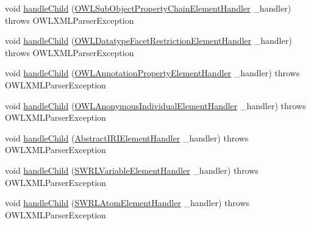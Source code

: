 \begin{DoxyCompactItemize}
\item 
void \hyperlink{classorg_1_1coode_1_1owlapi_1_1owlxmlparser_1_1_abstract_o_w_l_element_handler_3_01_o_01_4_a37fd0333809b18c0289ee31daeab97ff}{handle\-Child} (\hyperlink{classorg_1_1coode_1_1owlapi_1_1owlxmlparser_1_1_o_w_l_sub_object_property_chain_element_handler}{O\-W\-L\-Sub\-Object\-Property\-Chain\-Element\-Handler} \-\_\-handler)  throws O\-W\-L\-X\-M\-L\-Parser\-Exception 
\item 
void \hyperlink{classorg_1_1coode_1_1owlapi_1_1owlxmlparser_1_1_abstract_o_w_l_element_handler_3_01_o_01_4_ae126d3ab0f6ee1b9274e4ec83a891763}{handle\-Child} (\hyperlink{classorg_1_1coode_1_1owlapi_1_1owlxmlparser_1_1_o_w_l_datatype_facet_restriction_element_handler}{O\-W\-L\-Datatype\-Facet\-Restriction\-Element\-Handler} \-\_\-handler)  throws O\-W\-L\-X\-M\-L\-Parser\-Exception 
\item 
void \hyperlink{classorg_1_1coode_1_1owlapi_1_1owlxmlparser_1_1_abstract_o_w_l_element_handler_3_01_o_01_4_a3552f1e80aff33288d173eaf42c14223}{handle\-Child} (\hyperlink{classorg_1_1coode_1_1owlapi_1_1owlxmlparser_1_1_o_w_l_annotation_property_element_handler}{O\-W\-L\-Annotation\-Property\-Element\-Handler} \-\_\-handler)  throws O\-W\-L\-X\-M\-L\-Parser\-Exception 
\item 
void \hyperlink{classorg_1_1coode_1_1owlapi_1_1owlxmlparser_1_1_abstract_o_w_l_element_handler_3_01_o_01_4_ac5ffff69b2ce466b8b39b9a23f54b842}{handle\-Child} (\hyperlink{classorg_1_1coode_1_1owlapi_1_1owlxmlparser_1_1_o_w_l_anonymous_individual_element_handler}{O\-W\-L\-Anonymous\-Individual\-Element\-Handler} \-\_\-handler)  throws O\-W\-L\-X\-M\-L\-Parser\-Exception 
\item 
void \hyperlink{classorg_1_1coode_1_1owlapi_1_1owlxmlparser_1_1_abstract_o_w_l_element_handler_3_01_o_01_4_a1e398e2d4804afcb6cb23475fdda3c9a}{handle\-Child} (\hyperlink{classorg_1_1coode_1_1owlapi_1_1owlxmlparser_1_1_abstract_i_r_i_element_handler}{Abstract\-I\-R\-I\-Element\-Handler} \-\_\-handler)  throws O\-W\-L\-X\-M\-L\-Parser\-Exception 
\item 
void \hyperlink{classorg_1_1coode_1_1owlapi_1_1owlxmlparser_1_1_abstract_o_w_l_element_handler_3_01_o_01_4_ad0269526e930584021d4045400d28606}{handle\-Child} (\hyperlink{classorg_1_1coode_1_1owlapi_1_1owlxmlparser_1_1_s_w_r_l_variable_element_handler}{S\-W\-R\-L\-Variable\-Element\-Handler} \-\_\-handler)  throws O\-W\-L\-X\-M\-L\-Parser\-Exception 
\item 
void \hyperlink{classorg_1_1coode_1_1owlapi_1_1owlxmlparser_1_1_abstract_o_w_l_element_handler_3_01_o_01_4_a31880c9401fe9c6427fb2b2687dba6d0}{handle\-Child} (\hyperlink{classorg_1_1coode_1_1owlapi_1_1owlxmlparser_1_1_s_w_r_l_atom_element_handler}{S\-W\-R\-L\-Atom\-Element\-Handler} \-\_\-handler)  throws O\-W\-L\-X\-M\-L\-Parser\-Exception 

\end{DoxyCompactItemize}

